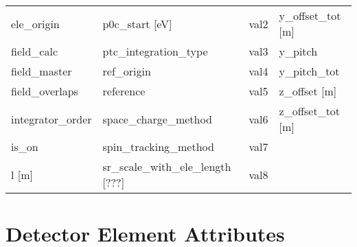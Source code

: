 \begin{tabular}{llll}
ele_origin                     & p0c_start [eV]                 & val2                           & y_offset_tot [m]               \\
field_calc                     & ptc_integration_type           & val3                           & y_pitch                        \\
field_master                   & ref_origin                     & val4                           & y_pitch_tot                    \\
field_overlaps                 & reference                      & val5                           & z_offset [m]                   \\
integrator_order               & space_charge_method            & val6                           & z_offset_tot [m]               \\
is_on                          & spin_tracking_method           & val7                           &                                \\
l [m]                          & sr_scale_with_ele_length [???] & val8                           &                                \\
 \bottomrule
 \end{tabular}
 \vfill
 
 \section{Detector Element Attributes}
 \label{s:list.detector}
 
